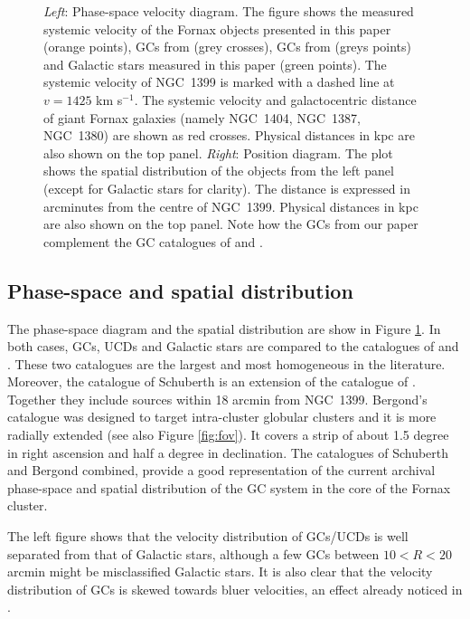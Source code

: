 \documentclass[useAMS,usenatbib]{mn2e}
\begin{document}
\begin{figure}
\caption{\textit{Left}: Phase-space velocity diagram. The figure shows the measured systemic velocity of the Fornax objects presented in this paper (orange points), GCs from \citet{Schuberth} (grey crosses), GCs from \citep{Bergond07} (greys points) and Galactic stars measured in this paper (green points). The systemic velocity of NGC~1399 is marked with a dashed line at $v = 1425$ km s$^{-1}$. The systemic velocity and galactocentric distance of giant Fornax galaxies (namely NGC~1404, NGC~1387, NGC~1380) are shown as red crosses. Physical distances in kpc are also shown on the top panel. \textit{Right}: Position diagram. The plot shows the spatial distribution of the objects from the left panel (except for Galactic stars for clarity). The distance is expressed in arcminutes from the centre of NGC~1399. Physical distances in kpc are also shown on the top panel.  Note how the GCs from our paper complement the GC catalogues of \citet{Schuberth} and \citep{Bergond07}. }
\label{fig:phase-space}
\end{figure}

\subsection{Phase-space and spatial distribution}

The phase-space diagram and the spatial distribution are show in Figure \ref{fig:phase-space}. In both cases, GCs, UCDs and Galactic stars are compared to the catalogues of \citet{Bergond07} and \citet{Schuberth}. These two catalogues are the largest and most homogeneous in the literature. Moreover, the catalogue of Schuberth is an extension of the catalogue of \citet{Dirsch04}. Together they include sources within 18 arcmin from NGC~1399. Bergond's catalogue was designed to target intra-cluster globular clusters and it is more radially extended (see also Figure \ref{fig:fov}). It covers a strip of about 1.5 degree in right ascension and half a degree in declination. The catalogues of Schuberth and Bergond combined, provide a good representation of the current archival phase-space and spatial distribution of the GC system in the core of the Fornax cluster. 

The left figure shows that the velocity distribution of GCs/UCDs is well separated from that of Galactic stars, although a few GCs between $10<R<20$ arcmin might be misclassified Galactic stars. It is also clear that the velocity distribution of GCs is skewed towards bluer velocities, an effect already noticed in \citep{Schuberth}. 
\end{document}
